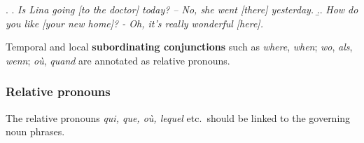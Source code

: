 \documentclass[a4paper]{article}
\begin{document}
\ex.
\a. {\sl Is Lina going [to the doctor] today? -- No, she went [there] yesterday.}
\b.. {\sl How do you like [your new home]? - Oh, it's really wonderful [here].}

Temporal and local \textbf{subordinating conjunctions} such as \textsl{where},
\textsl{when}; \textsl{wo}, \textsl{als}, \textsl{wenn}; \textsl{où},
\textsl{quand} are annotated as relative pronouns.

% 

% 
% 
% 
% 
% 
% 

\subsubsection{Relative pronouns}

The relative pronouns \textsl{qui, que, où, lequel} etc.\ should be linked to the
governing noun phrases.
\end{document}
